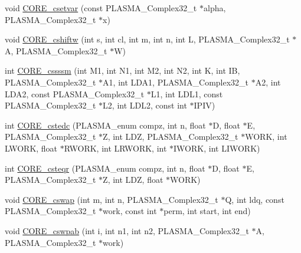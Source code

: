\begin{DoxyCompactItemize}
\item 
void \hyperlink{group__CORE__PLASMA__Complex32__t_ga5a4ce35ecc9ab293e9ac2e87e014600e_ga5a4ce35ecc9ab293e9ac2e87e014600e}{C\+O\+R\+E\+\_\+csetvar} (const P\+L\+A\+S\+M\+A\+\_\+\+Complex32\+\_\+t $\ast$alpha, P\+L\+A\+S\+M\+A\+\_\+\+Complex32\+\_\+t $\ast$x)
\item 
void \hyperlink{group__CORE__PLASMA__Complex32__t_gab0a0a5546fe5684fd80361eda2783551_gab0a0a5546fe5684fd80361eda2783551}{C\+O\+R\+E\+\_\+cshiftw} (int s, int cl, int m, int n, int L, P\+L\+A\+S\+M\+A\+\_\+\+Complex32\+\_\+t $\ast$A, P\+L\+A\+S\+M\+A\+\_\+\+Complex32\+\_\+t $\ast$W)
\item 
int \hyperlink{group__CORE__PLASMA__Complex32__t_gacbcf50ddacade063d4e4dd5051cfec30_gacbcf50ddacade063d4e4dd5051cfec30}{C\+O\+R\+E\+\_\+cssssm} (int M1, int N1, int M2, int N2, int K, int I\+B, P\+L\+A\+S\+M\+A\+\_\+\+Complex32\+\_\+t $\ast$A1, int L\+D\+A1, P\+L\+A\+S\+M\+A\+\_\+\+Complex32\+\_\+t $\ast$A2, int L\+D\+A2, const P\+L\+A\+S\+M\+A\+\_\+\+Complex32\+\_\+t $\ast$L1, int L\+D\+L1, const P\+L\+A\+S\+M\+A\+\_\+\+Complex32\+\_\+t $\ast$L2, int L\+D\+L2, const int $\ast$I\+P\+I\+V)
\item 
int \hyperlink{group__CORE__PLASMA__Complex32__t_gade63ed2cd31cb0e5c0623391bcd78020_gade63ed2cd31cb0e5c0623391bcd78020}{C\+O\+R\+E\+\_\+cstedc} (P\+L\+A\+S\+M\+A\+\_\+enum compz, int n, float $\ast$D, float $\ast$E, P\+L\+A\+S\+M\+A\+\_\+\+Complex32\+\_\+t $\ast$Z, int L\+D\+Z, P\+L\+A\+S\+M\+A\+\_\+\+Complex32\+\_\+t $\ast$W\+O\+R\+K, int L\+W\+O\+R\+K, float $\ast$R\+W\+O\+R\+K, int L\+R\+W\+O\+R\+K, int $\ast$I\+W\+O\+R\+K, int L\+I\+W\+O\+R\+K)
\item 
int \hyperlink{group__CORE__PLASMA__Complex32__t_gacc1980ec0484bb5269932a4f1c2bf7d1_gacc1980ec0484bb5269932a4f1c2bf7d1}{C\+O\+R\+E\+\_\+csteqr} (P\+L\+A\+S\+M\+A\+\_\+enum compz, int n, float $\ast$D, float $\ast$E, P\+L\+A\+S\+M\+A\+\_\+\+Complex32\+\_\+t $\ast$Z, int L\+D\+Z, float $\ast$W\+O\+R\+K)
\item 
void \hyperlink{group__CORE__PLASMA__Complex32__t_ga5a34d585eb419bdfbad7618373628dee_ga5a34d585eb419bdfbad7618373628dee}{C\+O\+R\+E\+\_\+cswap} (int m, int n, P\+L\+A\+S\+M\+A\+\_\+\+Complex32\+\_\+t $\ast$Q, int ldq, const P\+L\+A\+S\+M\+A\+\_\+\+Complex32\+\_\+t $\ast$work, const int $\ast$perm, int start, int end)
\item 
void \hyperlink{group__CORE__PLASMA__Complex32__t_gaf6ebd36cbbb1b5fa7edb0499df48742d_gaf6ebd36cbbb1b5fa7edb0499df48742d}{C\+O\+R\+E\+\_\+cswpab} (int i, int n1, int n2, P\+L\+A\+S\+M\+A\+\_\+\+Complex32\+\_\+t $\ast$A, P\+L\+A\+S\+M\+A\+\_\+\+Complex32\+\_\+t $\ast$work)

\end{DoxyCompactItemize}
